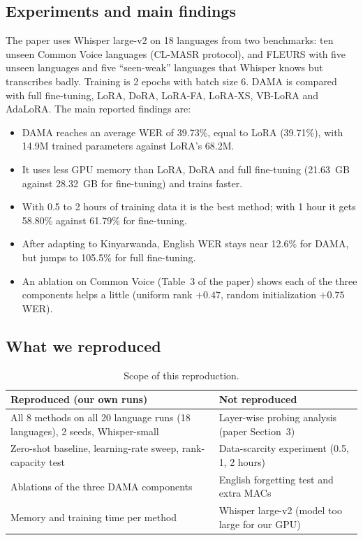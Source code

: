 \documentclass[11pt,a4paper]{article}
\begin{document}
\subsection{Experiments and main findings}
The paper uses Whisper large-v2 on 18 languages from two benchmarks: ten unseen Common Voice languages (CL-MASR protocol), and FLEURS with five unseen languages and five ``seen-weak'' languages that Whisper knows but transcribes badly. Training is 2 epochs with batch size 6. DAMA is compared with full fine-tuning, LoRA, DoRA, LoRA-FA, LoRA-XS, VB-LoRA and AdaLoRA. The main reported findings are:
\begin{itemize}
\item DAMA reaches an average WER of 39.73\%, equal to LoRA (39.71\%), with 14.9M trained parameters against LoRA's 68.2M.
\item It uses less GPU memory than LoRA, DoRA and full fine-tuning (21.63~GB against 28.32~GB for fine-tuning) and trains faster.
\item With 0.5 to 2 hours of training data it is the best method; with 1 hour it gets 58.80\% against 61.79\% for fine-tuning.
\item After adapting to Kinyarwanda, English WER stays near 12.6\% for DAMA, but jumps to 105.5\% for full fine-tuning.
\item An ablation on Common Voice (Table~3 of the paper) shows each of the three components helps a little (uniform rank $+0.47$, random initialization $+0.75$ WER).
\end{itemize}

\subsection{What we reproduced}
\begin{table}[H]\centering\small
\begin{tabular}{p{7.2cm}p{7.4cm}}\toprule
\textbf{Reproduced (our own runs)} & \textbf{Not reproduced}\\\midrule
All 8 methods on all 20 language runs (18 languages), 2 seeds, Whisper-small & Layer-wise probing analysis (paper Section~3)\\
Zero-shot baseline, learning-rate sweep, rank-capacity test & Data-scarcity experiment (0.5, 1, 2 hours)\\
Ablations of the three DAMA components & English forgetting test and extra MACs\\
Memory and training time per method & Whisper large-v2 (model too large for our GPU)\\\bottomrule
\end{tabular}
\caption{Scope of this reproduction.}
\end{table}
\end{document}
